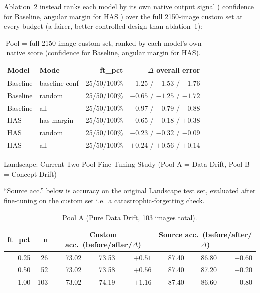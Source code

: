 Ablation~2 instead ranks each model by its own native output signal ( confidence for
Baseline, angular margin for HAS ) over the full 2150-image custom set at every budget
(a fairer, better-controlled design than ablation~1):

\begin{table}[htbp]
\centering
\caption{Pool = full 2150-image custom set, ranked by each model's own native score (confidence for Baseline, angular margin for HAS).}
\label{tab:extra_ablation2}
\begin{tabular}{@{} l l r r @{}}
\toprule
\textbf{Model} & \textbf{Mode} & \textbf{ft\_pct} & \textbf{$\Delta$ overall error} \\
\midrule
Baseline & baseline-conf & 25/50/100\% & $-1.25$ / $-1.53$ / $-1.76$ \\
Baseline & random        & 25/50/100\% & $-0.65$ / $-1.25$ / $-1.72$ \\
Baseline & all           & 25/50/100\% & $-0.97$ / $-0.79$ / $-0.88$ \\
HAS      & has-margin    & 25/50/100\% & $-0.65$ / $-0.18$ / $+0.38$ \\
HAS      & random        & 25/50/100\% & $-0.23$ / $-0.32$ / $-0.09$ \\
HAS      & all           & 25/50/100\% & $+0.24$ / $+0.56$ / $+0.14$ \\
\bottomrule
\end{tabular}
\end{table}


Landscape: Current Two-Pool Fine-Tuning Study (Pool A = Data Drift, Pool B = Concept Drift)
\label{sec:extra_landscape_pool}


``Source acc.'' below is accuracy on the original Landscape test set, evaluated after
fine-tuning on the custom set i.e.\ a catastrophic-forgetting check.

\begin{table}[htbp]
\centering
\caption{Pool A (Pure Data Drift, 103 images total).}
\label{tab:extra_pool_a}
\begin{tabular}{@{} r r rrr rrr @{}}
\toprule
\textbf{ft\_pct} & \textbf{n} & \multicolumn{3}{c}{\textbf{Custom acc.\ (before/after/$\Delta$)}} & \multicolumn{3}{c}{\textbf{Source acc.\ (before/after/$\Delta$)}} \\
\midrule
0.25 & 26  & 73.02 & 73.53 & $+0.51$ & 87.40 & 86.80 & $-0.60$ \\
0.50 & 52  & 73.02 & 73.58 & $+0.56$ & 87.40 & 87.20 & $-0.20$ \\
1.00 & 103 & 73.02 & 74.19 & $+1.16$ & 87.40 & 86.60 & $-0.80$ \\
\bottomrule
\end{tabular}
\end{table}

